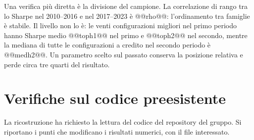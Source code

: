 \documentclass[11pt,a4paper]{article}
\begin{document}
Una verifica più diretta è la divisione del campione. La correlazione di rango tra lo Sharpe nel 2010--2016 e nel 2017--2023 è @@rho@@: l'ordinamento tra famiglie è stabile. Il livello non lo è: le venti configurazioni migliori nel primo periodo hanno Sharpe medio @@toph1@@ nel primo e @@toph2@@ nel secondo, mentre la mediana di tutte le configurazioni a credito nel secondo periodo è @@medh2@@. Un parametro scelto sul passato conserva la posizione relativa e perde circa tre quarti del risultato.

\section{Verifiche sul codice preesistente}\label{sec:codice}

La ricostruzione ha richiesto la lettura del codice del repository del gruppo. Si riportano i punti che modificano i risultati numerici, con il file interessato.
\end{document}
